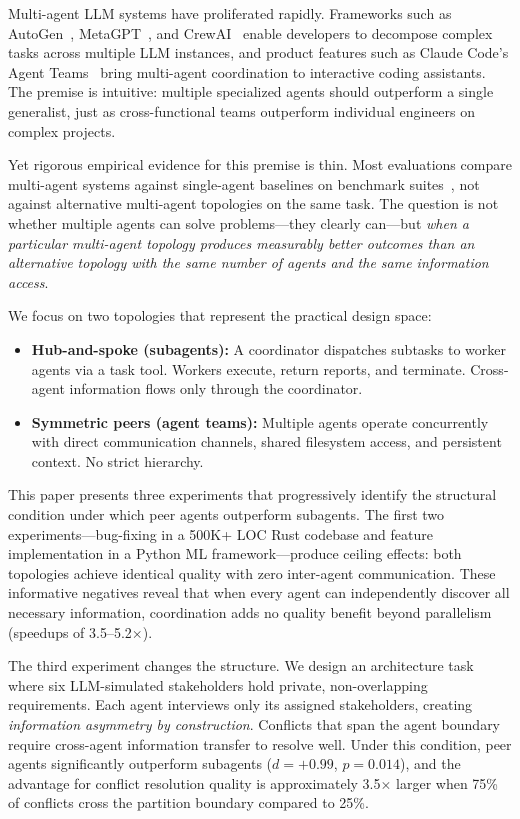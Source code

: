 \documentclass[11pt,letterpaper]{article}
\newcommand{\pval}[1]{\ensuremath{p = #1}}
\newcommand{\deff}[1]{\ensuremath{d = #1}}
\begin{document}
Multi-agent LLM systems have proliferated rapidly. Frameworks such as
AutoGen~\cite{wu2023autogen}, MetaGPT~\cite{hong2024metagpt}, and
CrewAI~\cite{moura2023crewai} enable developers to decompose complex tasks
across multiple LLM instances, and product features such as Claude Code's
Agent Teams~\cite{anthropic2026agentteams} bring multi-agent coordination
to interactive coding assistants. The premise is intuitive: multiple
specialized agents should outperform a single generalist, just as
cross-functional teams outperform individual engineers on complex projects.

Yet rigorous empirical evidence for this premise is thin. Most evaluations
compare multi-agent systems against single-agent baselines on benchmark
suites~\cite{liu2023agentbench}, not against alternative multi-agent
topologies on the same task. The question is not whether multiple agents
can solve problems---they clearly can---but \emph{when a particular
multi-agent topology produces measurably better outcomes than an
alternative topology with the same number of agents and the same
information access}.

We focus on two topologies that represent the practical design space:
\begin{itemize}
  \item \textbf{Hub-and-spoke (subagents):} A coordinator dispatches
    subtasks to worker agents via a task tool. Workers execute, return
    reports, and terminate. Cross-agent information flows only through
    the coordinator.
  \item \textbf{Symmetric peers (agent teams):} Multiple agents operate
    concurrently with direct communication channels, shared filesystem
    access, and persistent context. No strict hierarchy.
\end{itemize}

This paper presents three experiments that progressively identify the
structural condition under which peer agents outperform subagents. The
first two experiments---bug-fixing in a 500K+ LOC Rust codebase and
feature implementation in a Python ML framework---produce ceiling effects:
both topologies achieve identical quality with zero inter-agent
communication. These informative negatives reveal that when every agent
can independently discover all necessary information, coordination adds
no quality benefit beyond parallelism (speedups of 3.5--5.2$\times$).

The third experiment changes the structure. We design an architecture
task where six LLM-simulated stakeholders hold private, non-overlapping
requirements. Each agent interviews only its assigned stakeholders,
creating \emph{information asymmetry by construction}. Conflicts that
span the agent boundary require cross-agent information transfer to
resolve well. Under this condition, peer agents significantly outperform
subagents (\deff{+0.99}, \pval{0.014}), and the advantage for conflict
resolution quality is approximately 3.5$\times$ larger when 75\% of conflicts cross
the partition boundary compared to 25\%.
\end{document}
